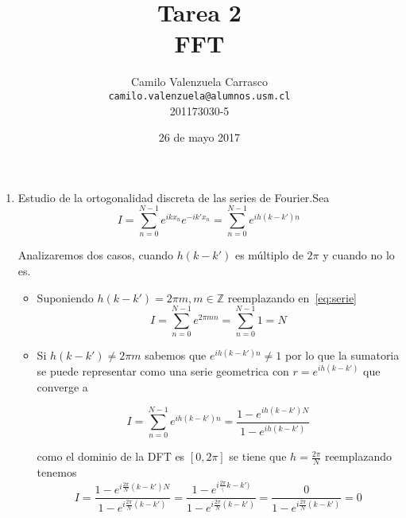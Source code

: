 \documentclass[spanish]{article}
\title{
  Tarea 2\\ FFT\\
}
\author{
  Camilo Valenzuela Carrasco \\ \texttt{camilo.valenzuela@alumnos.usm.cl}
  \\ 201173030-5
}
\date{26 de mayo 2017}
\begin{document}
  \maketitle
  
    
  
  
  
  \begin{enumerate}
  
  \item Estudio de la ortogonalidad discreta de las series de Fourier.Sea 
  \begin{equation} 
  \label{eq:serie}
    I = \displaystyle \sum_{n=0}^{N-1} e^{ikx_n} e^{-ik'x_n} =   \displaystyle \sum_{n=0}^{N-1} e^{ih(k-k')n}
  \end{equation}
  
  Analizaremos dos casos, cuando $h(k-k')$ es múltiplo de $2 \pi$ y cuando no lo es.
  
  \begin{itemize}
      \item Suponiendo $h(k-k') = 2 \pi m , m \in \mathbb{Z}$ reemplazando en~\ref{eq:serie}
        \begin{equation} 
        I = \displaystyle \sum_{n=0}^{N-1} e^{2\pi m n} = \displaystyle \sum_{n=0}^{N-1} 1 = N
      \end{equation}
      
      \item Si $h(k-k') \neq 2 \pi m$ sabemos que $e^{ih(k-k')n} \neq 1$ por lo que la sumatoria se puede representar como una serie geometrica con $r = e^{ih(k-k')}$ que converge a
      
      \begin{equation}
          I =\displaystyle \sum_{n=0}^{N-1} e^{ih(k-k')n} = \frac{1 - e^{i h(k-k') N}}{1 - e^{ih(k-k')}}
      \end{equation}
      
      como el dominio de la DFT es $[0, 2\pi]$ se tiene que $h = \frac{2\pi}{N}$ reemplazando tenemos 
      \begin{equation}
         I =  \frac{1 - e^{i \frac{2\pi}{N}(k-k') N}}{1 - e^{i\frac{2\pi}{N}(k-k')}}  = \frac{1 - e^{i \frac{2\pi}(k-k')}}{1 - e^{i\frac{2\pi}{N}(k-k')}} =   \frac{0}{1 - e^{i\frac{2\pi}{N}(k-k')}}  = 0
      \end{equation}
  \end{itemize}
  

\end{enumerate}
\end{document}
